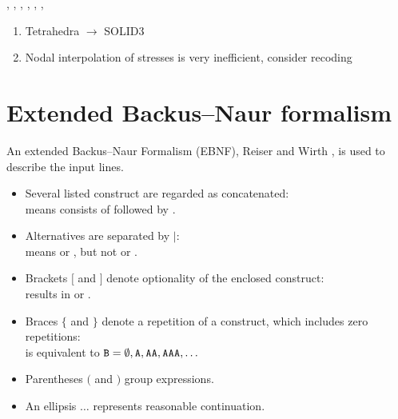 ,
,
,
,
,
,

\begin{enumerate}
\item Tetrahedra $\longrightarrow$ SOLID3
\item Nodal interpolation of stresses is very inefficient, consider recoding
\end{enumerate}

\section{Extended Backus--Naur formalism}\label{brick1:sec:ebnf}
An extended Backus--Naur Formalism (EBNF), Reiser and Wirth
, is used to describe the input lines.

\begin{itemize}
\item Several listed construct are regarded as concatenated:\\
   means  consists of  followed by .
\item Alternatives are separated by $|$:\\
   means  or , but not 
   or \@. 
\item Brackets $[$ and $]$ denote optionality of the enclosed 
  construct:\\
   results in  or \@.
\item Braces $\{$ and $\}$ denote a repetition of a construct, 
  which includes zero repetitions:\\
   is equivalent to $\texttt{\textup{B}} = \emptyset, \texttt{\textup{A}}, \texttt{\textup{AA}}, \texttt{\textup{AAA}}, \ldots$
\item Parentheses $($ and $)$ group expressions.
\item An ellipsis $\ldots$ represents reasonable continuation.
\end{itemize}